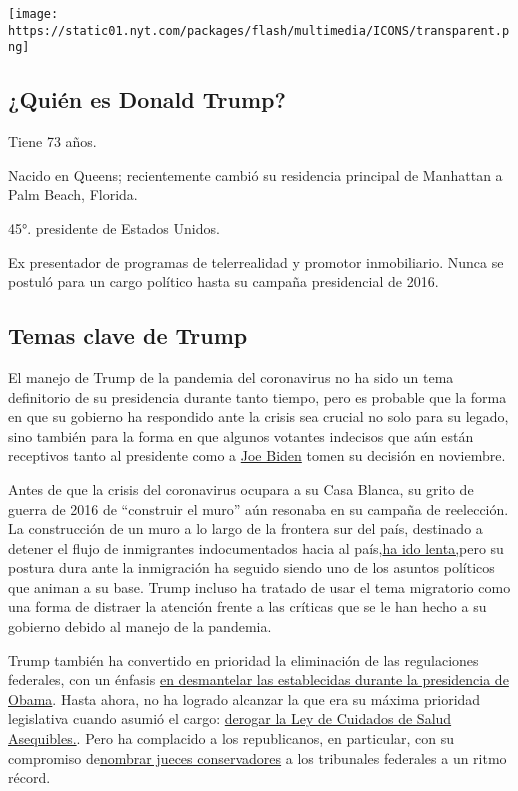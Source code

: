 \texttt{[image: https://static01.nyt.com/packages/flash/multimedia/ICONS/transparent.png]}

\hypertarget{quiuxe9n-es-donald-trump}{%
\subsection{¿Quién es Donald Trump?}\label{quiuxe9n-es-donald-trump}}

Tiene 73 años.

Nacido en Queens; recientemente cambió su residencia principal de
Manhattan a Palm Beach, Florida.

45°. presidente de Estados Unidos.

Ex presentador de programas de telerrealidad y promotor inmobiliario.
Nunca se postuló para un cargo político hasta su campaña presidencial de
2016.

\hypertarget{temas-clave-de-trump}{%
\subsection{Temas clave de Trump}\label{temas-clave-de-trump}}

El manejo de Trump de la pandemia del coronavirus no ha sido un tema
definitorio de su presidencia durante tanto tiempo, pero es probable que
la forma en que su gobierno ha respondido ante la crisis sea crucial no
solo para su legado, sino también para la forma en que algunos votantes
indecisos que aún están receptivos tanto al presidente como a
\href{https://www.nytimes.com/interactive/2020/07/13/espanol/mundo/joe-biden-elecciones.html\%0A}{Joe
Biden} tomen su decisión en noviembre.

Antes de que la crisis del coronavirus ocupara a su Casa Blanca, su
grito de guerra de 2016 de ``construir el muro'' aún resonaba en su
campaña de reelección. La construcción de un muro a lo largo de la
frontera sur del país, destinado a detener el flujo de inmigrantes
indocumentados hacia al
país,\href{https://www.nytimes.com/2019/11/08/us/border-wall-texas.html}{ha
ido lenta,}pero su postura dura ante la inmigración ha seguido siendo
uno de los asuntos políticos que animan a su base. Trump incluso ha
tratado de usar el tema migratorio como una forma de distraer la
atención frente a las críticas que se le han hecho a su gobierno debido
al manejo de la pandemia.

Trump también ha convertido en prioridad la eliminación de las
regulaciones federales, con un énfasis
\href{https://www.nytimes.com/interactive/2019/climate/trump-environment-rollbacks.html}{en
desmantelar las establecidas durante la presidencia de Obama}. Hasta
ahora, no ha logrado alcanzar la que era su máxima prioridad legislativa
cuando asumió el cargo:
\href{https://www.nytimes.com/2019/05/01/health/unconstitutional-trump-aca.html}{derogar
la Ley de Cuidados de Salud Asequibles.}. Pero ha complacido a los
republicanos, en particular, con su compromiso
de\href{https://www.nytimes.com/2020/03/14/us/trump-appeals-court-judges.html}{nombrar
jueces conservadores} a los tribunales federales a un ritmo récord.


